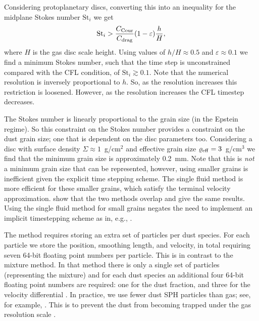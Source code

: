 \documentclass[fleqn,usenatbib]{mnras}
\begin{document}
Considering protoplanetary discs, converting this into an inequality for the
midplane Stokes number \(\mathrm{St}_i\) we get
%
\begin{align}
   \mathrm{St}_i > \frac{C_{\rm Cour}}{C_{\rm drag}} (1 - \varepsilon) \frac{h}{H},
\end{align}
%
where \(H\) is the gas disc scale height. Using values of \(h/H \approx 0.5\)
and \(\varepsilon \approx 0.1\) we find a minimum Stokes number, such that the
time step is unconstrained compared with the CFL condition, of \(\mathrm{St}_i
\gtrsim 0.1\). Note that the numerical resolution is inversely proportional to
\(h\). So, as the resolution increases this restriction is loosened. However, as
the resolution increases the CFL timestep decreases.

The Stokes number is linearly proportional to the grain size (in the Epstein
regime). So this constraint on the Stokes number provides a constraint on the
dust grain size; one that is dependent on the disc parameters too. Considering a
disc with surface density \(\Sigma \approx 1\)~g/cm\({}^2\) and effective grain
size \(\varrho_{\rm eff} = 3\)~g/cm\({}^3\) we find that the minimum grain size
is approximately 0.2~mm. Note that this is \emph{not} a minimum grain size that
can be represented, however, using smaller grains is inefficient given the
explicit time stepping scheme. The single fluid method is more efficient for
these smaller grains, which satisfy the terminal velocity approximation.
\citet{Cuello2019MNRAS.483.4114C} show that the two methods overlap and give the
same results. Using the single fluid method for small grains negates the need to
implement an implicit timestepping scheme as in, e.g.,
\citet{Loren-Aguilar2014MNRAS.443..927L, Loren-Aguilar2015MNRAS.454.4114L}.

The method requires storing an extra set of particles per dust species. For each
particle we store the position, smoothing length, and velocity, in total
requiring seven 64-bit floating point numbers per particle. This is in contrast
to the mixture method. In that method there is only a single set of particles
(representing the mixture) and for each dust species an additional four 64-bit
floating point numbers are required: one for the dust fraction, and three for
the velocity differential \citep{Hutchison2018MNRAS.476.2186H}. In practice, we
use fewer dust SPH particles than gas; see, for example,
\citet{Dipierro2015MNRAS.453L..73D, Mentiplay2019MNRAS.484L.130M,
Calcino2019MNRAS.490.2579C}. This is to prevent the dust from becoming trapped
under the gas resolution scale \citep{Laibe2012MNRAS.420.2345L}.
\end{document}
